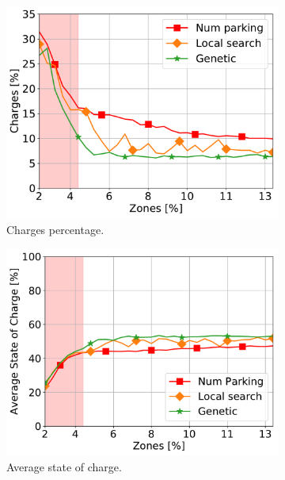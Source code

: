 \begin{figure}[t!]
	\begin{center}
		\begin{subfigure}{0.49\textwidth}
			\includegraphics[width=\columnwidth]{figures/Needed_AmountRechargePerc.pdf}
			\caption{Charges percentage.}
			\label{fig:7_7b_recharge_Needed}
		\end{subfigure}
		\begin{subfigure}{0.49\textwidth}
			\includegraphics[width=\columnwidth]{figures/AvgSOC_comparison_N}
			\caption{Average state of charge.}
			\label{fig:7_7b_asoc_Needed}
		\end{subfigure}
		\begin{subfigure}{0.49\textwidth}

\end{subfigure}
\end{center}
\end{figure}
